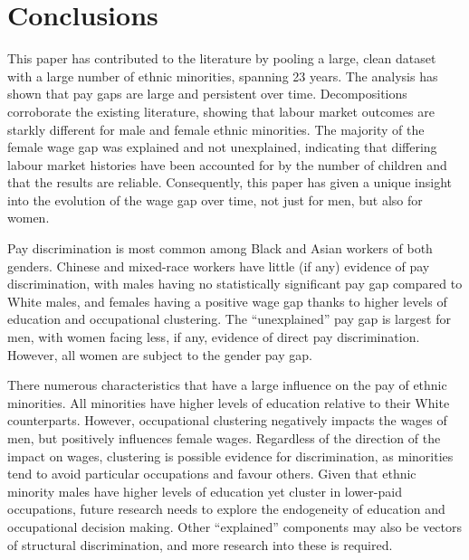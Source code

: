 \documentclass[class=article, crop=false]{standalone}
\begin{document}
\section{Conclusions}
\label{sec:Conclusions}
This paper has contributed to the literature by pooling a large, clean dataset with a large number of ethnic minorities, spanning 23 years. The analysis has shown that pay gaps are large and persistent over time. Decompositions corroborate the existing literature, showing that labour market outcomes are starkly different for male and female ethnic minorities. The majority of the female wage gap was explained and not unexplained, indicating that differing labour market histories have been accounted for by the number of children and that the results are reliable. Consequently, this paper has given a unique insight into the evolution of the wage gap over time, not just for men, but also for women. %

Pay discrimination is most common among Black and Asian workers of both genders. Chinese and mixed-race workers have little (if any) evidence of pay discrimination, with males having no statistically significant pay gap compared to White males, and females having a positive wage gap thanks to higher levels of education and occupational clustering. The \enquote{unexplained} pay gap is largest for men, with women facing less, if any, evidence of direct pay discrimination. However, all women are subject to the gender pay gap.

There numerous characteristics that have a large influence on the pay of ethnic minorities. All minorities have higher levels of education relative to their White counterparts. However, occupational clustering negatively impacts the wages of men, but positively influences female wages. Regardless of the direction of the impact on wages, clustering is possible evidence for discrimination, as minorities tend to avoid particular occupations and favour others. Given that ethnic minority males have higher levels of education yet cluster in lower-paid occupations, future research needs to explore the endogeneity of education and occupational decision making. Other \enquote{explained} components may also be vectors of structural discrimination, and more research into these is required.
\end{document}
